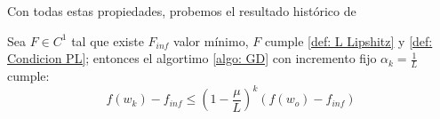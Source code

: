 Con todas estas propiedades, probemos el resultado hist\'orico de  \cite{polyak:1963}

\begin{theorem}
	\label{theorem: convergencia lineal GD}
	Sea $F \in C^1$ tal que existe $F_{inf}$ valor m\'inimo, $F$ cumple \ref{def: L Lipshitz} y \ref{def: Condicion PL}; entonces el algortimo \ref{algo: GD} con incremento fijo $\alpha_k = \frac{1}{L}$ cumple:
	\begin{equation}
	f(w_k) - f_{inf} \leq \left(1 - \frac{\mu}{L}\right)^k \left(f(w_o) - f_{inf}\right)
	\end{equation}
\end{theorem}
